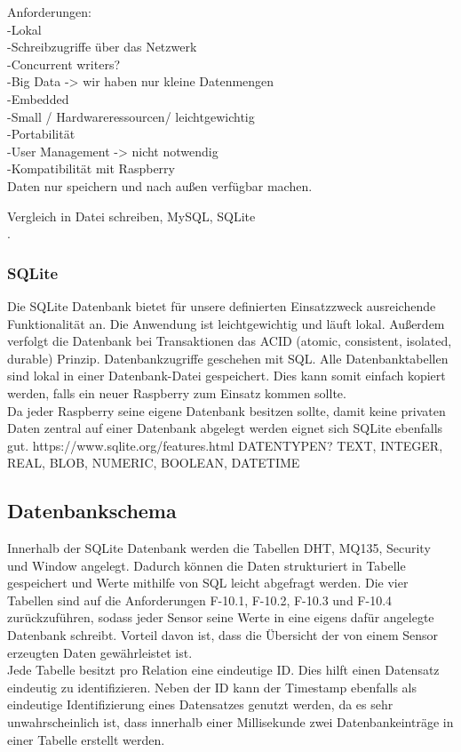 Anforderungen:\\
-Lokal \\
-Schreibzugriffe über das Netzwerk\\
-Concurrent writers?\\
-Big Data -> wir haben nur kleine Datenmengen\\
-Embedded\\
-Small / Hardwareressourcen/ leichtgewichtig\\
-Portabilität\\
-User Management -> nicht notwendig\\
-Kompatibilität mit Raspberry\\

Daten nur speichern und nach außen verfügbar machen.

Vergleich in Datei schreiben, MySQL, SQLite\\
.
\subsubsection{SQLite}
Die SQLite Datenbank bietet für unsere definierten Einsatzzweck ausreichende Funktionalität an. Die Anwendung ist leichtgewichtig und läuft lokal. Außerdem verfolgt die Datenbank bei Transaktionen das ACID (atomic, consistent, isolated, durable) Prinzip. Datenbankzugriffe geschehen mit SQL. Alle Datenbanktabellen sind lokal in einer Datenbank-Datei gespeichert. Dies kann somit einfach kopiert werden, falls ein neuer Raspberry zum Einsatz kommen sollte.\\
Da jeder Raspberry seine eigene Datenbank besitzen sollte, damit keine privaten Daten zentral auf einer Datenbank abgelegt werden eignet sich SQLite ebenfalls gut.   https://www.sqlite.org/features.html
DATENTYPEN? TEXT, INTEGER, REAL, BLOB, NUMERIC, BOOLEAN, DATETIME


\subsection{Datenbankschema}\label{db:DB}
Innerhalb der SQLite Datenbank werden die Tabellen DHT, MQ135, Security und Window angelegt. Dadurch können die Daten strukturiert in Tabelle gespeichert und Werte mithilfe von SQL leicht abgefragt werden. Die vier Tabellen sind auf die Anforderungen F-10.1, F-10.2, F-10.3 und F-10.4 zurückzuführen, sodass jeder Sensor seine Werte in eine eigens dafür angelegte Datenbank schreibt. Vorteil davon ist, dass die Übersicht der von einem Sensor erzeugten Daten gewährleistet ist.\\
Jede Tabelle besitzt pro Relation eine eindeutige ID. Dies hilft einen Datensatz eindeutig zu identifizieren. Neben der ID kann der Timestamp ebenfalls als eindeutige Identifizierung eines Datensatzes genutzt werden, da es sehr unwahrscheinlich ist, dass innerhalb einer Millisekunde zwei Datenbankeinträge in einer Tabelle erstellt werden.\\

